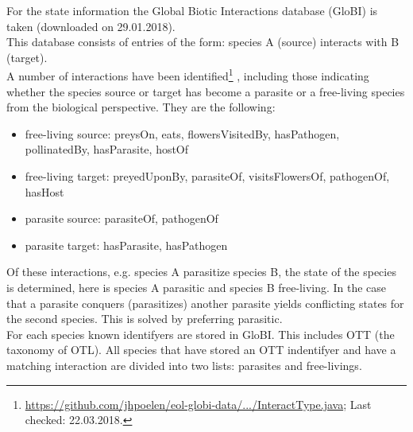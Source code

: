     For the state information the Global Biotic Interactions database (GloBI) is taken 
      \cite{Poelen2014} (downloaded on 29.01.2018). \\
    This database consists of entries of the form: species A (source) interacts with B (target). \\
    A number of interactions have been identified\footnote{\hyperlink{
      https://github.com/jhpoelen/eol-globi-data/blob/master/eol-globi-lib/src/main/java/org/eol/globi/domain/InteractType.java
      }{https://github.com/jhpoelen/eol-globi-data/.../InteractType.java}; Last checked: 22.03.2018.}
      , including those indicating whether the species source or target has become a parasite or a 
      free-living species from the biological perspective. They are the following:
    \begin{itemize}
      \item free-living source: preysOn, eats, flowersVisitedBy, hasPathogen, pollinatedBy, 
        hasParasite, hostOf
      \item free-living target: preyedUponBy, parasiteOf, visitsFlowersOf, pathogenOf, hasHost
      \item parasite source: parasiteOf, pathogenOf
      \item parasite target: hasParasite, hasPathogen
    \end{itemize}
    Of these interactions, e.g. species A parasitize species B, the state of the species is 
      determined, here is species A parasitic and species B free-living. In the case that a parasite 
      conquers (parasitizes) another parasite yields conflicting states for the second species. 
      This is solved by preferring parasitic. \\
    For each species known identifyers are stored in GloBI. This includes OTT (the taxonomy of OTL). 
      All species that have stored an OTT indentifyer and have a matching interaction are divided into 
      two lists: parasites and free-livings.

